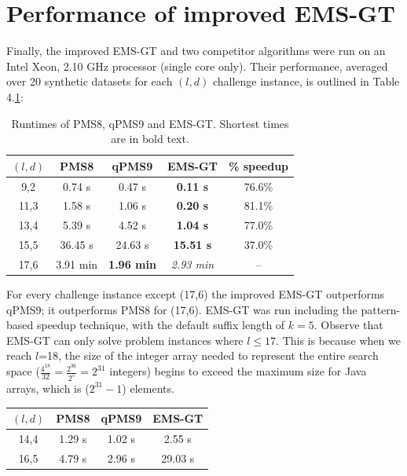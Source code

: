 \documentclass[oneside,12pt]{DISCSthesis}
\begin{document}
{	\section{Performance of improved EMS-GT}
		Finally, the improved EMS-GT and two competitor algorithms were run on an Intel Xeon, 2.10 GHz processor (single core only). Their performance, averaged over 20 synthetic datasets for each $(l,d)$ challenge instance, is outlined in Table 4.\ref{tbl:runtimes_v_pms}:\newline

		\begin{table}[ht] %
			\small
			\renewcommand{\arraystretch}{1.3}
			\label{tbl:runtimes_v_pms}
			\centering
			\begin{tabular}{|c|c|c|c|c|}
			\hline \bfseries\boldmath $(l,d)$ & \bfseries PMS8 & \bfseries qPMS9 & \bfseries EMS-GT & \bfseries \% speedup\\
			\hline
			 9,2 &  0.74 s  &  0.47 s & {\bf 0.11 s} & 76.6\%\\
			11,3 &  1.58 s  &  1.06 s & {\bf 0.20 s} & 81.1\%\\
			13,4 &  5.39 s  &  4.52 s & {\bf 1.04 s} & 77.0\%\\
			15,5 & 36.45 s  & 24.63 s & {\bf15.51 s} & 37.0\%\\
			17,6 &  3.91 min & \textbf{1.96 min} & {\emph{2.93 min}} & --\\
			\hline\end{tabular}

			\caption{\small Runtimes of PMS8, qPMS9 and EMS-GT. Shortest times are in bold text.}
			\end{table}

		For every challenge instance except (17,6) the improved EMS-GT outperforms qPMS9; it outperforms PMS8 for (17,6). EMS-GT was run including the pattern-based speedup technique, with the default suffix length of $k=5$. Observe that EMS-GT can only solve problem instances where $l \leq 17$. This is because when we reach $l$=18, the size of the integer array needed to represent the entire search space ($\frac{4^{18}}{32} = \frac{2^{36}}{2^{5}} = 2^{31}$ integers) begins to exceed the maximum size for Java arrays, which is ($2^{31} - 1$) elements.\newline

		\begin{table}[ht] %
			\small
			\renewcommand{\arraystretch}{1.3}
			\label{tbl:runtimes_nonchallenge}
			\centering
			\begin{tabular}{|c|c|c|c|}
			\hline \bfseries\boldmath $(l,d)$ & \bfseries PMS8 & \bfseries qPMS9 & \bfseries EMS-GT \\
			\hline
			14,4 &  1.29 s  &  1.02 s &      2.55 s\\
			16,5 &  4.79 s  &  2.96 s &     29.03 s\\
			\hline\end{tabular}


\end{table}}
\end{document}
